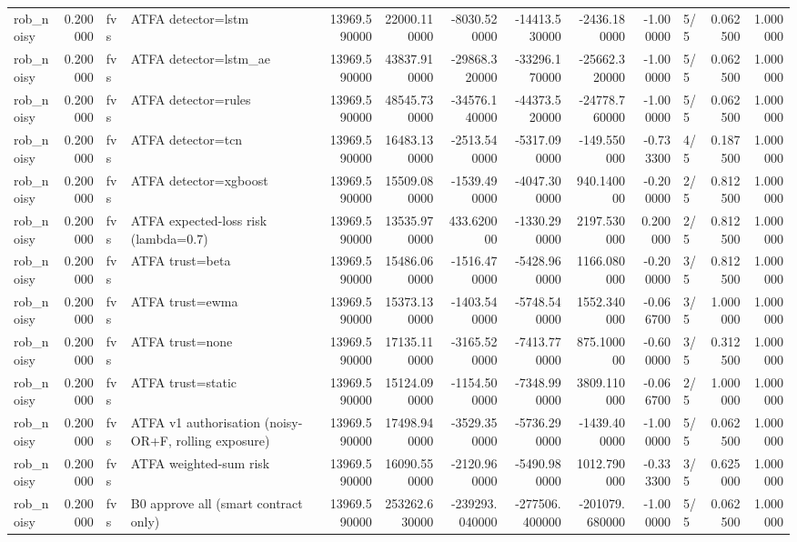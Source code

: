 \begin{tabular}{lrllrrrrrrlrr}
rob\_noisy & 0.200000 & fvs & ATFA detector=lstm & 13969.590000 & 22000.110000 & -8030.520000 & -14413.530000 & -2436.180000 & -1.000000 & 5/5 & 0.062500 & 1.000000 \\
rob\_noisy & 0.200000 & fvs & ATFA detector=lstm\_ae & 13969.590000 & 43837.910000 & -29868.320000 & -33296.170000 & -25662.320000 & -1.000000 & 5/5 & 0.062500 & 1.000000 \\
rob\_noisy & 0.200000 & fvs & ATFA detector=rules & 13969.590000 & 48545.730000 & -34576.140000 & -44373.520000 & -24778.760000 & -1.000000 & 5/5 & 0.062500 & 1.000000 \\
rob\_noisy & 0.200000 & fvs & ATFA detector=tcn & 13969.590000 & 16483.130000 & -2513.540000 & -5317.090000 & -149.550000 & -0.733300 & 4/5 & 0.187500 & 1.000000 \\
rob\_noisy & 0.200000 & fvs & ATFA detector=xgboost & 13969.590000 & 15509.080000 & -1539.490000 & -4047.300000 & 940.140000 & -0.200000 & 2/5 & 0.812500 & 1.000000 \\
rob\_noisy & 0.200000 & fvs & ATFA expected-loss risk (lambda=0.7) & 13969.590000 & 13535.970000 & 433.620000 & -1330.290000 & 2197.530000 & 0.200000 & 2/5 & 0.812500 & 1.000000 \\
rob\_noisy & 0.200000 & fvs & ATFA trust=beta & 13969.590000 & 15486.060000 & -1516.470000 & -5428.960000 & 1166.080000 & -0.200000 & 3/5 & 0.812500 & 1.000000 \\
rob\_noisy & 0.200000 & fvs & ATFA trust=ewma & 13969.590000 & 15373.130000 & -1403.540000 & -5748.540000 & 1552.340000 & -0.066700 & 3/5 & 1.000000 & 1.000000 \\
rob\_noisy & 0.200000 & fvs & ATFA trust=none & 13969.590000 & 17135.110000 & -3165.520000 & -7413.770000 & 875.100000 & -0.600000 & 3/5 & 0.312500 & 1.000000 \\
rob\_noisy & 0.200000 & fvs & ATFA trust=static & 13969.590000 & 15124.090000 & -1154.500000 & -7348.990000 & 3809.110000 & -0.066700 & 2/5 & 1.000000 & 1.000000 \\
rob\_noisy & 0.200000 & fvs & ATFA v1 authorisation (noisy-OR+F, rolling exposure) & 13969.590000 & 17498.940000 & -3529.350000 & -5736.290000 & -1439.400000 & -1.000000 & 5/5 & 0.062500 & 1.000000 \\
rob\_noisy & 0.200000 & fvs & ATFA weighted-sum risk & 13969.590000 & 16090.550000 & -2120.960000 & -5490.980000 & 1012.790000 & -0.333300 & 3/5 & 0.625000 & 1.000000 \\
rob\_noisy & 0.200000 & fvs & B0 approve all (smart contract only) & 13969.590000 & 253262.630000 & -239293.040000 & -277506.400000 & -201079.680000 & -1.000000 & 5/5 & 0.062500 & 1.000000 \\

\end{tabular}

